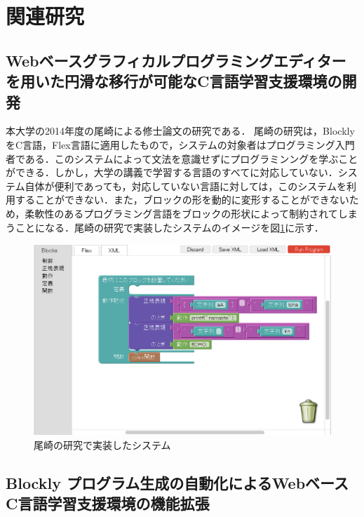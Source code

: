 \documentclass{risepaper}
\begin{document}
    \section{関連研究}
    
    \subsection{Webベースグラフィカルプログラミングエディターを用いた円滑な移行が可能なC言語学習支援環境の開発}
 
 本大学の2014年度の尾崎による修士論文\cite{ozaki}の研究である．
 尾崎の研究は，BlocklyをC言語，Flex言語に適用したもので，システムの対象者はプログラミング入門者である．このシステムによって文法を意識せずにプログラミンングを学ぶことができる．しかし，大学の講義で学習する言語のすべてに対応していない．システム自体が便利であっても，対応していない言語に対しては，このシステムを利用することができない．また，ブロックの形を動的に変形することができないため，柔軟性のあるプログラミング言語をブロックの形状によって制約されてしまうことになる．尾崎の研究で実装したシステムのイメージを図\ref{fig:ozaki}に示す． 


\begin{figure}[h]
\begin{center}
\includegraphics[scale=0.5]{img/ozaki.eps}
\caption{尾崎の研究で実装したシステム}%
\label{fig:ozaki}
\end{center}%
\end{figure}%
 
	\subsection{Blockly プログラム生成の自動化によるWebベースC言語学習支援環境の機能拡張}
 
\end{document}
